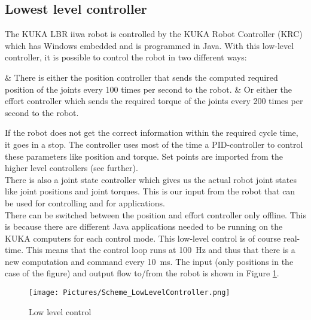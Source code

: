 \documentclass[11pt,a4paper]{report}
\begin{document}
\subsection{Lowest level controller}
The KUKA LBR iiwa robot is controlled by the KUKA Robot Controller (KRC)  \cite{ROSControl} which has Windows embedded and is programmed in Java. With this low-level controller, it is possible to control the robot in two different ways:
\begin{easylist}
& There is either the position controller that sends the computed required position of the joints every 100 times per second to the robot.
& Or either the effort controller which sends the required torque of the joints every 200 times per second to the robot.
\end{easylist}
If the robot does not get the correct information within the required cycle time, it goes in a stop. The controller uses most of the time a PID-controller to control these parameters like position and torque. Set points are imported from the higher level controllers (see further).\\ There is also a joint state controller which gives us the actual robot joint states like joint positions and joint torques. This is our input from the robot that can be used for controlling and for applications.\\There can be switched between the position and effort controller only offline. This is because there are different Java applications needed to be running on the KUKA computers for each control mode. This low-level control is of course real-time. This means that the control loop runs at 100~Hz and thus that there is a new computation and command every 10~ms. The input (only positions in the case of the figure) and output flow to/from the robot is shown in Figure \ref{fig:RobotLowLevelController}.
\begin{figure}[!ht]
	\centering
	\texttt{[image: Pictures/Scheme\_LowLevelController.png]}
	\caption{Low level control}
	\label{fig:RobotLowLevelController}
\end{figure}
\newpage
\end{document}
